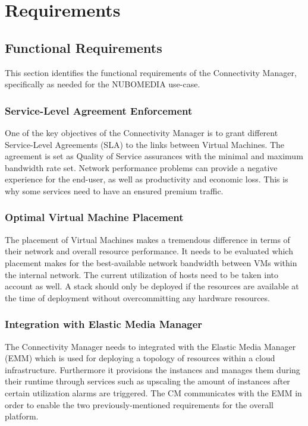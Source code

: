 \chapter{Requirements}

\section{Functional Requirements}

This section identifies the functional requirements of the Connectivity Manager, specifically as needed for the NUBOMEDIA use-case.

\subsection{Service-Level Agreement Enforcement}

One of the key objectives of the Connectivity Manager is to grant different Service-Level Agreements (SLA) to the links between Virtual Machines. The agreement is set as Quality of Service assurances with the minimal and maximum bandwidth rate set. Network performance problems can provide a negative experience for the end-user, as well as productivity and economic loss. This is why some services need to have an ensured premium traffic.

\subsection{Optimal Virtual Machine Placement}

The placement of Virtual Machines makes a tremendous difference in terms of their network and overall resource performance. It needs to be evaluated which placement makes for the best-available network bandwidth between VMs within the internal network. The current utilization of hosts need to be taken into account as well. A stack should only be deployed if the resources are available at the time of deployment without overcommitting any hardware resources.

\subsection{Integration with Elastic Media Manager}

The Connectivity Manager needs to integrated with the Elastic Media Manager (EMM) which is used for deploying a topology of resources within a cloud infrastructure. Furthermore it provisions the instances and manages them during their runtime through services such as upscaling the amount of instances after certain utilization alarms are triggered. The CM communicates with the EMM in order to enable the two previously-mentioned requirements for the overall platform.

